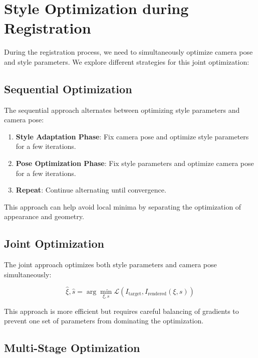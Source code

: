 \section{Style Optimization during Registration}

During the registration process, we need to simultaneously optimize camera pose and style parameters. We explore different strategies for this joint optimization:

\subsection{Sequential Optimization}

The sequential approach alternates between optimizing style parameters and camera pose:

\begin{enumerate}
    \item \textbf{Style Adaptation Phase}: Fix camera pose and optimize style parameters for a few iterations.
    
    \item \textbf{Pose Optimization Phase}: Fix style parameters and optimize camera pose for a few iterations.
    
    \item \textbf{Repeat}: Continue alternating until convergence.
\end{enumerate}

This approach can help avoid local minima by separating the optimization of appearance and geometry.

\subsection{Joint Optimization}

The joint approach optimizes both style parameters and camera pose simultaneously:

\begin{equation}
    \hat{\xi}, \hat{s} = \arg\min_{\xi, s} \mathcal{L}(I_{\text{target}}, I_{\text{rendered}}(\xi, s))
\end{equation}

This approach is more efficient but requires careful balancing of gradients to prevent one set of parameters from dominating the optimization.

\subsection{Multi-Stage Optimization}

